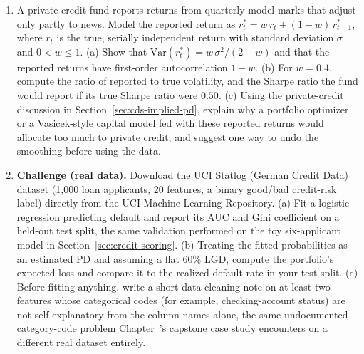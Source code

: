 \documentclass[../ai_in_finance]{subfiles}
\begin{document}
\begin{enumerate}[exercises]
    \item A private-credit fund reports returns from quarterly model marks that adjust only partly to news. Model the reported return as $r^*_t = w\,r_t + (1-w)\,r^*_{t-1}$, where $r_t$ is the true, serially independent return with standard deviation $\sigma$ and $0<w\le 1$. (a) Show that $\text{Var}(r^*_t) = w\,\sigma^2/(2-w)$ and that the reported returns have first-order autocorrelation $1-w$. (b) For $w=0.4$, compute the ratio of reported to true volatility, and the Sharpe ratio the fund would report if its true Sharpe ratio were $0.50$. (c) Using the private-credit discussion in Section~\ref{sec:cds-implied-pd}, explain why a portfolio optimizer or a Vasicek-style capital model fed with these reported returns would allocate too much to private credit, and suggest one way to undo the smoothing before using the data.
    \item \textbf{Challenge (real data).} Download the UCI Statlog (German Credit Data) dataset (1,000 loan applicants, 20 features, a binary good/bad credit-risk label) directly from the UCI Machine Learning Repository. (a) Fit a logistic regression predicting default and report its AUC and Gini coefficient on a held-out test split, the same validation performed on the toy six-applicant model in Section~\ref{sec:credit-scoring}. (b) Treating the fitted probabilities as an estimated PD and assuming a flat $60\%$ LGD, compute the portfolio's expected loss and compare it to the realized default rate in your test split. (c) Before fitting anything, write a short data-cleaning note on at least two features whose categorical codes (for example, checking-account status) are not self-explanatory from the column names alone, the same undocumented-category-code problem Chapter~'s capstone case study encounters on a different real dataset entirely.
\end{enumerate}

\end{document}
